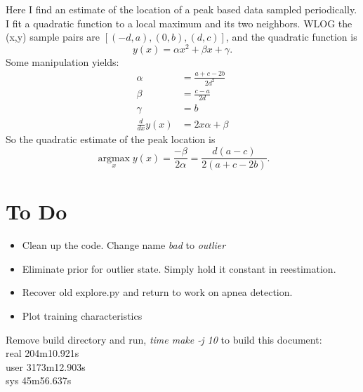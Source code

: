 \documentclass[12pt]{article}
\newcommand{\argmax}{\operatorname*{argmax}}
\begin{document}
Here I find an estimate of the location of a peak based data sampled
periodically.  I fit a quadratic function to a local maximum and its
two neighbors.  WLOG the (x,y) sample pairs are $[(-d,a), (0,b),
(d,c)]$, and the quadratic function is
\begin{equation*}
  y(x) = \alpha x^2 + \beta x + \gamma.
\end{equation*}
Some manipulation yields:
\begin{align*}
  \alpha &= \frac{a+c-2b}{2d^2} \\
  \beta &= \frac{c-a}{2d} \\
  \gamma &= b \\
  \frac{d}{dx} y(x) &= 2x\alpha + \beta
\end{align*}
So the quadratic estimate of the peak location is
\begin{equation*}
  \argmax_x y(x) = \frac{-\beta}{2\alpha} = \frac{d(a-c)}{2(a+c-2b)}.
\end{equation*}

\section{To Do}
\label{sec:todo}

\begin{itemize}
\item Clean up the code.  Change name \emph{bad} to \emph{outlier}
\item Eliminate prior for outlier state.  Simply hold it constant in
  reestimation.
\item Recover old explore.py and return to work on apnea detection.
\end{itemize}

\begin{itemize}
\item Plot training characteristics
\end{itemize}

Remove build directory and run, \emph{time make -j 10} to build this
document:\\
%
real	204m10.921s\\
%
user	3173m12.903s\\
%
sys	45m56.637s
\end{document}
